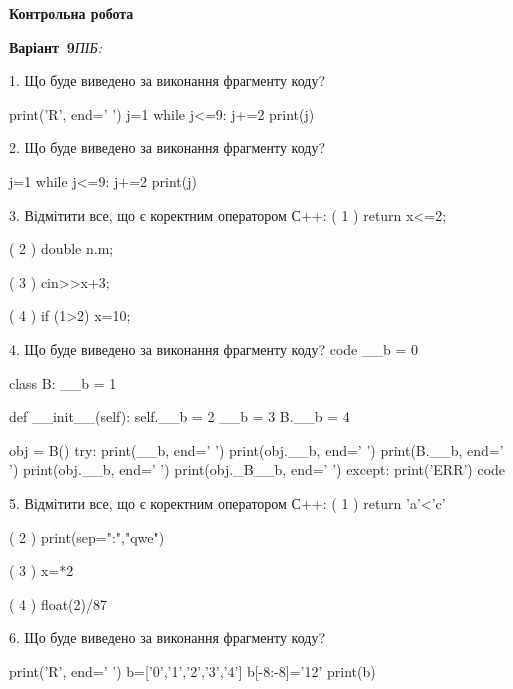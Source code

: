 \documentclass[11pt]{article}
\begin{document}
{\large\textbf{Контрольна робота}}

\textbf{Варіант \No\,9}\hfill \textit{ПІБ:}\,\underline{\hspace{60mm}}
\vspace{4mm}

1. Що буде виведено за виконання фрагменту коду?

print('R', end=' ')
j=1
while j<=9:
    j+=2
print(j)

\vspace{5mm}

2. Що буде виведено за виконання фрагменту коду?

j=1
while j<=9:
    j+=2
print(j)

\vspace{5mm}

3. %
Відмітити все, що є коректним оператором С++:
( 1 ) return x<=2;

( 2 ) double n.m;

( 3 ) cin>>x+3;

( 4 ) if (1>2) x=10;
\vspace{5mm}

4. Що буде виведено за виконання фрагменту коду?
code
__b = 0

class B:
    __b = 1
    
    def __init__(self):
        self.__b = 2
        __b = 3
        B.__b = 4

obj = B()
try:
    print(__b, end=' ')
    print(obj.__b, end=' ')
    print(B.__b, end=' ')
    print(obj.__b, end=' ')
    print(obj._B__b, end=' ')
except:
    print('ERR')
code
\vspace{5mm}

5. %
Відмітити все, що є коректним оператором С++:
( 1 ) return 'a'<'c'

( 2 ) print(sep=":","qwe")

( 3 ) x=*2

( 4 ) float(2)/87
\vspace{5mm}

6. Що буде виведено за виконання фрагменту коду?

print('R', end=' ')
b=['0','1','2','3','4']
b[-8:-8]='12'
print(b)

\vspace{5mm}
\end{document}
